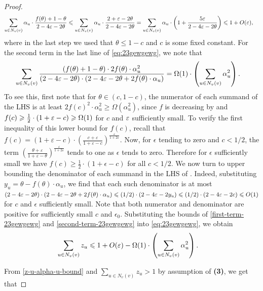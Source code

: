 \begin{proof}
\begin{align}
	\sum_{u\in N_v(v)}\alpha_u\cdot \frac{f(\theta) + 1-\theta}{2-4\varepsilon-2\theta} & \leqslant \sum_{u\in N_v(v)}\alpha_u\cdot  \frac{{2+\varepsilon-2\theta}}{{2-4\varepsilon-2\theta}} = \sum_{u\in N_v(v)}\alpha_u\cdot \left( 1+\frac{5\varepsilon}{2-4\varepsilon-2\theta}\right) \leqslant 1+O(\varepsilon),
	\end{align}
	where in the last step we used that $\theta\leq 1-c$ and $c$ is some fixed constant.
	For the second term in the last line of \eqref{eq:23gewgewg}, we note that 
	\begin{align}\label{second-term-23gewgewg}
		\sum_{u\in N_v(v)} \frac{(f(\theta)+1-\theta)\cdot 2f(\theta)\cdot \alpha_u^2}{(2-4\varepsilon-2\theta)\cdot (2-4\varepsilon-2\theta+2f(\theta)\cdot \alpha_u)} & = \Omega(1)\cdot \left(\sum_{u\in N_v(v)} \alpha_u^2 \right).
	\end{align}
	To see this, first note that for $\theta\in (c,1-c)$, the numerator of each summand of the LHS is at least $2f(c)^2 \cdot \alpha_u^2 \geq \Omega(\alpha_u^2)$, since $f$ is decreasing by  and $f(c)\geqslant \frac{1}{2}\cdot (1+\varepsilon-c) \geqslant \Omega(1)$ for $c$ and $\varepsilon$ sufficiently small.
	To verify the first inequality of this lower bound for $f(c)$, recall that 
	$f(c) = \left(1+ \varepsilon - c\right) \cdot \left(
	\frac{c+\varepsilon}{1+\varepsilon-c}
	\right)^{\frac{\varepsilon}{1+2\varepsilon}}$. Now, for $\epsilon$ tending to zero and $c<1/2$, the term $\left(
	\frac{\theta+\varepsilon}{1+\varepsilon-\theta}
	\right)^{\frac{\varepsilon}{1+2\varepsilon}}$ tends to one as $\epsilon$ tends to zero. Therefore for $\epsilon$ sufficiently small we have $f(c)\geq \frac{1}{2}\cdot (1+\epsilon-c)$ for all $c < 1/2$.
	We now turn to upper bounding the denominator of 
	each summand in the LHS of .
	Indeed, substituting $y_u = \theta-f(\theta)\cdot \alpha_u$, we find that each such denominator is at most
	$(2-4\varepsilon-2\theta)\cdot (2-4\varepsilon-2\theta+2f(\theta)\cdot \alpha_u) \leqslant (1/2)\cdot (2-4\varepsilon - 2y_u) \leqslant (1/2)\cdot(2-4\varepsilon - 2c) \leqslant O(1)$ for $c$ and $\epsilon$ sufficiently small. Note that both numerator and denominator are positive for sufficiently small $c$ and $\epsilon_0$.
	Substituting the bounds of \eqref{first-term-23gewgewg} and \eqref{second-term-23gewgewg} into \eqref{eq:23gewgewg}, we obtain
	\begin{align}\label{z-u-alpha-u-bound}
	\sum_{u\in N_v(v)} z_u
	& \leqslant 1 + O(\varepsilon) -\Omega(1)\cdot \left(\sum_{u\in N_v(v)} \alpha_u^2\right).
	\end{align}

From \cref{z-u-alpha-u-bound} and $\sum_{u\in N_v(v)} z_u > 1$ by assumption of {\bf(3)}, we get that


\end{proof}
